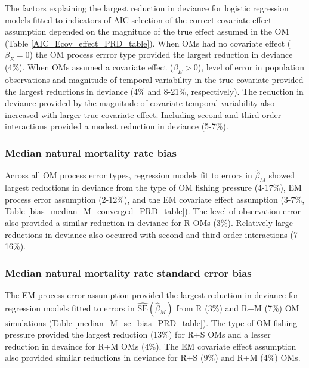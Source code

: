 \documentclass[
  12pt,
]{article}
\begin{document}
The factors explaining the largest reduction in deviance for logistic
regression models fitted to indicators of AIC selection of the correct
covariate effect assumption depended on the magnitude of the true effect
assumed in the OM (Table \ref{AIC_Ecov_effect_PRD_table}). When OMs had
no covariate effect (\(\beta_E = 0\)) the OM process errror type
provided the largest reduction in deviance (4\%). When OMs assumed a
covariate effect (\(\beta_E>0\)), level of error in population
observations and magnitude of temporal variability in the true covariate
provided the largest reductions in deviance (4\% and 8-21\%,
respectively). The reduction in deviance provided by the magnitude of
covariate temporal variability also increased with larger true covariate
effect. Including second and third order interactions provided a modest
reduction in deviance (5-7\%).

\subsubsection*{Median natural mortality rate
bias}\label{median-natural-mortality-rate-bias}

Across all OM process error types, regression models fit to errors in
\(\widehat \beta_M\) showed largest reductions in deviance from the type
of OM fishing pressure (4-17\%), EM process error assumption (2-12\%),
and the EM covariate effect assumption (3-7\%, Table
\ref{bias_median_M_converged_PRD_table}). The level of observation error
also provided a similar reduction in deviance for R OMs (3\%).
Relatively large reductions in deviance also occurred with second and
third order interactions (7-16\%).

\subsubsection*{Median natural mortality rate standard error
bias}\label{median-natural-mortality-rate-standard-error-bias}

The EM process error assumption provided the largest reduction in
deviance for regression models fitted to errors in
\(\widehat {\text{SE}}\left(\widehat \beta_M\right)\) from R (3\%) and
R+M (7\%) OM simulations (Table \ref{median_M_se_bias_PRD_table}). The
type of OM fishing pressure provided the largest reduction (13\%) for
R+S OMs and a lesser reduction in devaince for R+M OMs (4\%). The EM
covariate effect assumption also provided similar reductions in deviance
for R+S (9\%) and R+M (4\%) OMs.
\end{document}
